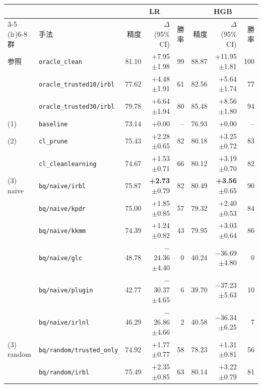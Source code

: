 \begin{tabular}{llrrrrrr}
\toprule
 &  & \multicolumn{3}{c}{LR} & \multicolumn{3}{c}{HGB} \\
\cmidrule(lr){3-5} \cmidrule(lr){6-8}
群 & 手法 & 精度 & $\Delta$ (95\% CI) & 勝率 & 精度 & $\Delta$ (95\% CI) & 勝率 \\
\midrule
参照 & \texttt{oracle\_clean} & 81.10 & +7.95 {\scriptsize$\pm$1.98} & 99 & 88.87 & +11.95 {\scriptsize$\pm$1.81} & 100 \\
 & \texttt{oracle\_trusted10/irbl} & 77.62 & +4.48 {\scriptsize$\pm$1.91} & 61 & 82.56 & +5.64 {\scriptsize$\pm$1.74} & 77 \\
 & \texttt{oracle\_trusted30/irbl} & 79.78 & +6.64 {\scriptsize$\pm$1.94} & 80 & 85.48 & +8.56 {\scriptsize$\pm$1.80} & 94 \\
\addlinespace
(1) & \texttt{baseline} & 73.14 & +0.00 & -- & 76.93 & +0.00 & -- \\
\addlinespace
(2) & \texttt{cl\_prune} & 75.43 & +2.28 {\scriptsize$\pm$0.65} & 82 & 80.18 & +3.25 {\scriptsize$\pm$0.72} & 83 \\
 & \texttt{cl\_cleanlearning} & 74.67 & +1.53 {\scriptsize$\pm$0.71} & 66 & 80.12 & +3.19 {\scriptsize$\pm$0.70} & 82 \\
\addlinespace
(3) naive & \texttt{bq/naive/irbl} & 75.87 & \textbf{+2.73} {\scriptsize$\pm$0.79} & 82 & 80.49 & \textbf{+3.56} {\scriptsize$\pm$0.65} & 90 \\
 & \texttt{bq/naive/kpdr} & 75.00 & +1.85 {\scriptsize$\pm$0.85} & 57 & 79.32 & +2.40 {\scriptsize$\pm$0.53} & 84 \\
 & \texttt{bq/naive/kkmm} & 74.39 & +1.24 {\scriptsize$\pm$0.82} & 43 & 79.95 & +3.03 {\scriptsize$\pm$0.64} & 86 \\
 & \texttt{bq/naive/glc} & 48.78 & $-$24.36 {\scriptsize$\pm$4.40} & 0 & 40.24 & $-$36.69 {\scriptsize$\pm$4.80} & 0 \\
 & \texttt{bq/naive/plugin} & 42.77 & $-$30.37 {\scriptsize$\pm$4.65} & 6 & 39.70 & $-$37.23 {\scriptsize$\pm$5.63} & 10 \\
 & \texttt{bq/naive/irlnl} & 46.29 & $-$26.86 {\scriptsize$\pm$4.66} & 2 & 40.58 & $-$36.34 {\scriptsize$\pm$6.25} & 7 \\
\addlinespace
(3) random & \texttt{bq/random/trusted\_only} & 74.92 & +1.77 {\scriptsize$\pm$0.77} & 58 & 78.23 & +1.31 {\scriptsize$\pm$0.81} & 56 \\
 & \texttt{bq/random/irbl} & 75.49 & +2.35 {\scriptsize$\pm$0.85} & 63 & 80.14 & +3.22 {\scriptsize$\pm$0.79} & 81 \\

\end{tabular}

